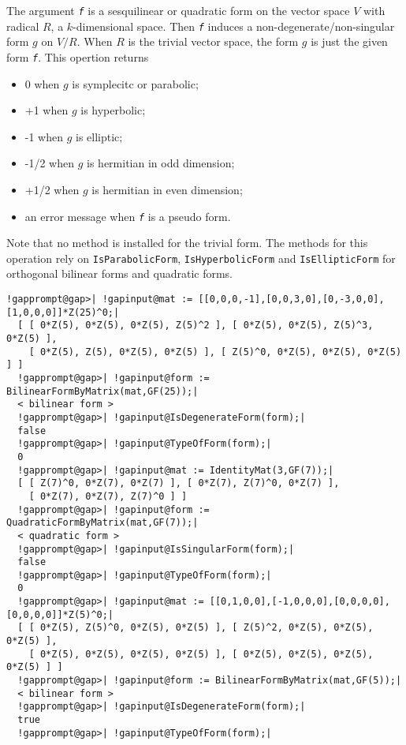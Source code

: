 \documentclass[a4paper,11pt]{report}
\begin{document}
{{{ The argument \mbox{\texttt{\mdseries\slshape f}} is a sesquilinear or quadratic form on the vector space $V$ with radical $R$, a $k$-dimensional space. Then \mbox{\texttt{\mdseries\slshape f}} induces a non-degenerate/non-singular form $g$ on $V/R$. When $R$ is the trivial vector space, the form $g$ is just the given form \mbox{\texttt{\mdseries\slshape f}}. This opertion returns 
\begin{itemize}
\item 0 when $g$ is symplecitc or parabolic;
\item +1 when $g$ is hyperbolic;
\item -1 when $g$ is elliptic;
\item -1/2 when $g$ is hermitian in odd dimension;
\item +1/2 when $g$ is hermitian in even dimension;
\item an error message when \mbox{\texttt{\mdseries\slshape f}} is a pseudo form.
\end{itemize}
 Note that no method is installed for the trivial form. The methods for this
operation rely on \texttt{IsParabolicForm}, \texttt{IsHyperbolicForm} and \texttt{IsEllipticForm} for orthogonal bilinear forms and quadratic forms. 
\begin{Verbatim}[commandchars=!@|,fontsize=\small,frame=single,label=Example]
  !gapprompt@gap>| !gapinput@mat := [[0,0,0,-1],[0,0,3,0],[0,-3,0,0],[1,0,0,0]]*Z(25)^0;|
  [ [ 0*Z(5), 0*Z(5), 0*Z(5), Z(5)^2 ], [ 0*Z(5), 0*Z(5), Z(5)^3, 0*Z(5) ], 
    [ 0*Z(5), Z(5), 0*Z(5), 0*Z(5) ], [ Z(5)^0, 0*Z(5), 0*Z(5), 0*Z(5) ] ]
  !gapprompt@gap>| !gapinput@form := BilinearFormByMatrix(mat,GF(25));|
  < bilinear form >
  !gapprompt@gap>| !gapinput@IsDegenerateForm(form);|
  false
  !gapprompt@gap>| !gapinput@TypeOfForm(form);|
  0
  !gapprompt@gap>| !gapinput@mat := IdentityMat(3,GF(7));|
  [ [ Z(7)^0, 0*Z(7), 0*Z(7) ], [ 0*Z(7), Z(7)^0, 0*Z(7) ], 
    [ 0*Z(7), 0*Z(7), Z(7)^0 ] ]
  !gapprompt@gap>| !gapinput@form := QuadraticFormByMatrix(mat,GF(7));|
  < quadratic form >
  !gapprompt@gap>| !gapinput@IsSingularForm(form);|
  false
  !gapprompt@gap>| !gapinput@TypeOfForm(form);|
  0
  !gapprompt@gap>| !gapinput@mat := [[0,1,0,0],[-1,0,0,0],[0,0,0,0],[0,0,0,0]]*Z(5)^0;|
  [ [ 0*Z(5), Z(5)^0, 0*Z(5), 0*Z(5) ], [ Z(5)^2, 0*Z(5), 0*Z(5), 0*Z(5) ], 
    [ 0*Z(5), 0*Z(5), 0*Z(5), 0*Z(5) ], [ 0*Z(5), 0*Z(5), 0*Z(5), 0*Z(5) ] ]
  !gapprompt@gap>| !gapinput@form := BilinearFormByMatrix(mat,GF(5));|
  < bilinear form >
  !gapprompt@gap>| !gapinput@IsDegenerateForm(form);|
  true
  !gapprompt@gap>| !gapinput@TypeOfForm(form);|

\end{Verbatim}}}}
\end{document}
